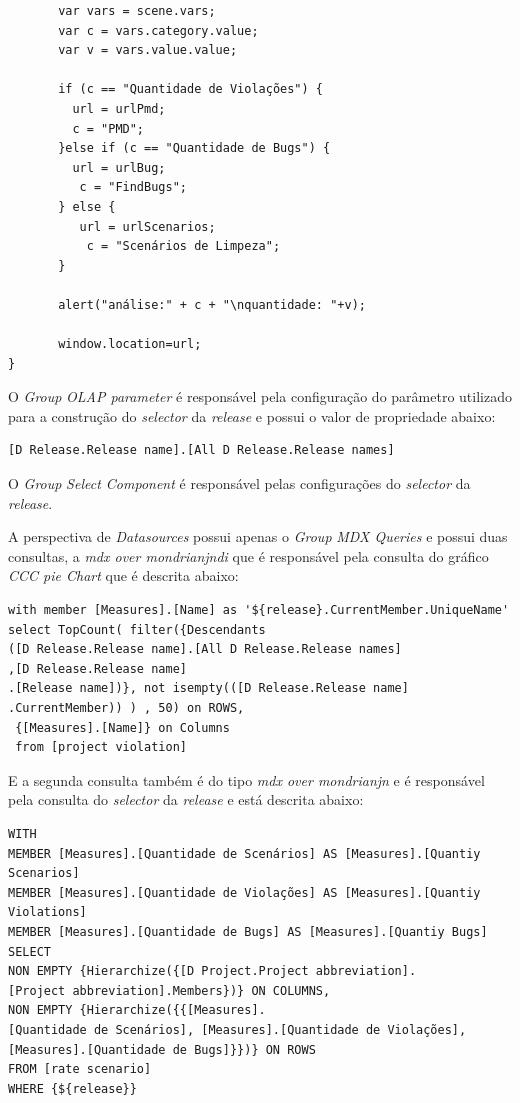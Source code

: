\begin{apendicesenv}
{\begin{verbatim}
       var vars = scene.vars;
       var c = vars.category.value;
       var v = vars.value.value;
       
       if (c == "Quantidade de Violações") {
         url = urlPmd;
         c = "PMD";
       }else if (c == "Quantidade de Bugs") {
         url = urlBug;
          c = "FindBugs";
       } else {
          url = urlScenarios;
           c = "Scenários de Limpeza";
       } 
       
       alert("análise:" + c + "\nquantidade: "+v);
      
       window.location=url;  
} 
\end{verbatim}
}

O \textit{Group} \textit{OLAP parameter} é responsável pela configuração do parâmetro utilizado para a construção do \textit{selector} da \textit{release} e possui o valor de propriedade abaixo:

{\color{blue}
\begin{verbatim}
[D Release.Release name].[All D Release.Release names]
\end{verbatim}
}

O \textit{Group} \textit{Select Component} é responsável pelas configurações do \textit{selector} da \textit{release}.

A perspectiva de \textit{Datasources} possui apenas o \textit{Group} \textit{MDX Queries} e possui duas consultas, a \textit{mdx over mondrianjndi} que é responsável pela consulta do gráfico \textit{CCC pie Chart} que é descrita abaixo:

{\color{blue}
\begin{verbatim}
with member [Measures].[Name] as '${release}.CurrentMember.UniqueName' 
select TopCount( filter({Descendants
([D Release.Release name].[All D Release.Release names] 
,[D Release.Release name]
.[Release name])}, not isempty(([D Release.Release name]
.CurrentMember)) ) , 50) on ROWS, 
 {[Measures].[Name]} on Columns 
 from [project violation]
\end{verbatim}
}

E a segunda consulta também é do tipo \textit{mdx over mondrianjn} e é responsável pela consulta do \textit{selector} da \textit{release} e está descrita abaixo:

{\color{blue}
\begin{verbatim}
WITH 
MEMBER [Measures].[Quantidade de Scenários] AS [Measures].[Quantiy Scenarios]
MEMBER [Measures].[Quantidade de Violações] AS [Measures].[Quantiy Violations]
MEMBER [Measures].[Quantidade de Bugs] AS [Measures].[Quantiy Bugs]
SELECT
NON EMPTY {Hierarchize({[D Project.Project abbreviation].
[Project abbreviation].Members})} ON COLUMNS,
NON EMPTY {Hierarchize({{[Measures].
[Quantidade de Scenários], [Measures].[Quantidade de Violações], 
[Measures].[Quantidade de Bugs]}})} ON ROWS
FROM [rate scenario]
WHERE {${release}}
\end{verbatim}
}



\end{apendicesenv}
